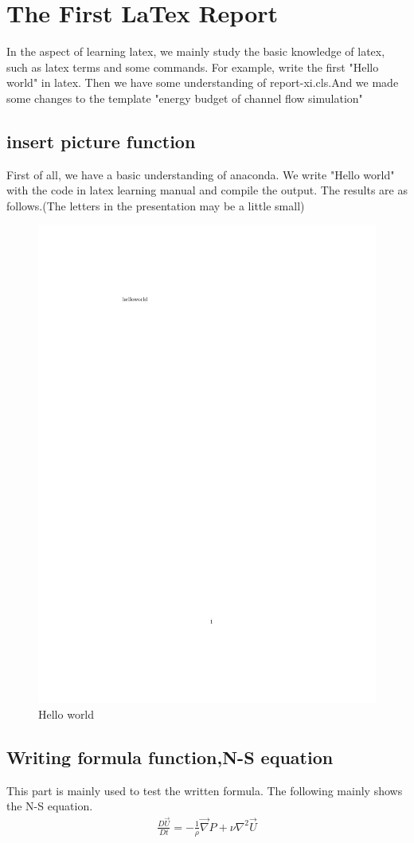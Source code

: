 \section{The First LaTex Report}
In the aspect of learning latex, we mainly study the basic knowledge of latex, such as latex terms and some commands. For example, write the first "Hello world" in latex. Then we have some understanding of report-xi.cls.And we made some changes to the template "energy budget of channel flow simulation"
\subsection{insert picture function}
First of all, we have a basic understanding of anaconda. We write "Hello world" with the code in latex learning manual and compile the output. The results are as follows.(The letters in the presentation may be a little small)
\begin{figure}[htbp]
\centering
    \includegraphics[width=0.3\textwidth\textwidth]{src/helloworld.pdf}
\caption{Hello world}
\label{pd}
\end{figure}



\subsection{Writing formula function,N-S equation}
This part is mainly used to test the written formula. The following mainly shows the N-S equation.
\begin{equation}
\begin{aligned}
\frac{D\vec{U}}{Dt}=-\frac{1}{\rho}\vec{\nabla}P+\nu\nabla^2\vec{U}
\end{aligned}
\end{equation}

